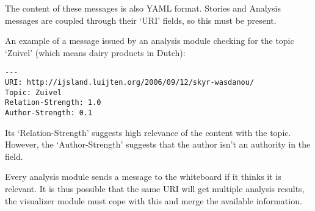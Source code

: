 The content of these messages is also YAML format. Stories and Analysis
messages are coupled through their `URI' fields, so this must be present.

An example of a message issued by an analysis module checking for the topic
`Zuivel' (which means dairy products in Dutch):

\begin{verbatim}
---
URI: http://ijsland.luijten.org/2006/09/12/skyr-wasdanou/
Topic: Zuivel
Relation-Strength: 1.0
Author-Strength: 0.1
\end{verbatim}

Its `Relation-Strength' suggests high relevance of the content with the topic.
However, the `Author-Strength' suggests that the author isn't an authority in
the field.

Every analysis module sends a message to the whiteboard if it thinks it is
relevant. It is thus possible that the same URI will get multiple analysis
results, the visualizer module must cope with this and merge the available
information.

